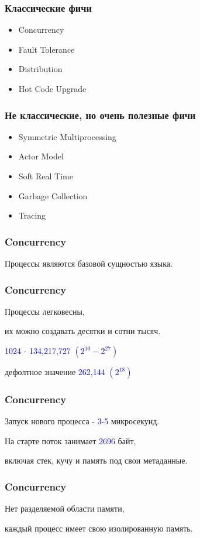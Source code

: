 \documentclass[10pt]{beamer}
\begin{document}
\begin{frame}
\frametitle{Классические фичи}
\begin{itemize}
\item Concurrency
\item Fault Tolerance
\item Distribution
\item Hot Code Upgrade
\end{itemize}
\end{frame}

\begin{frame}
\frametitle{Не классические, но очень полезные фичи}
\begin{itemize}
\item Symmetric Multiprocessing
\item Actor Model
\item Soft Real Time
\item Garbage Collection
\item Tracing
\end{itemize}
\end{frame}

\begin{frame}
\frametitle{Concurrency}
\centering
Процессы являются базовой сущностью языка.
\par \bigskip
\end{frame}

\begin{frame}
\frametitle{Concurrency}
\centering
Процессы легковесны,
\par
их можно создавать десятки и сотни тысяч.
\par \bigskip
\textcolor{blue}{1024 - 134,217,727 \begin{math}(2^{10} - 2^{27})\end{math}}
\par \bigskip
дефолтное значение \textcolor{blue}{262,144 \begin{math}(2^{18})\end{math}}
\end{frame}

\begin{frame}
\frametitle{Concurrency}
\centering
Запуск нового процесса - \textcolor{blue}{3-5} микросекунд.
\par \bigskip
На старте поток занимает \textcolor{blue}{2696} байт,
\par
включая стек, кучу и память под свои метаданные.
\end{frame}

\begin{frame}
\frametitle{Concurrency}
\centering
Нет разделяемой области памяти,
\par \bigskip
каждый процесс имеет свою изолированную память.
\end{frame}
\end{document}
